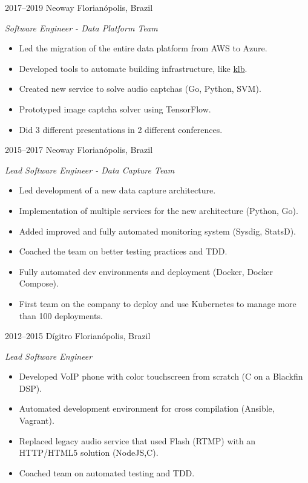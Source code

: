 \documentclass[]{friggeri-cv} %
\begin{document}
\begin{entrylist}
\entry
{2017--2019}
{Neoway}
{Florianópolis, Brazil}
{\emph{Software Engineer - Data Platform Team} \\

\begin{itemize}
  \item Led the migration of the entire data platform from AWS to Azure.
  \item Developed tools to automate building infrastructure, like {\href{https://github.com/NeowayLabs/klb}{klb}}.
  \item Created new service to solve audio captchas (Go, Python, SVM).
  \item Prototyped image captcha solver using TensorFlow.
  \item Did 3 different presentations in 2 different conferences.
\end{itemize}
}
\end{entrylist}

\begin{entrylist}
\entry
{2015--2017}
{Neoway}
{Florianópolis, Brazil}
{\emph{Lead Software Engineer - Data Capture Team} \\

\begin{itemize}
  \item Led development of a new data capture architecture.
  \item Implementation of multiple services for the new architecture (Python, Go).
  \item Added improved and fully automated monitoring system (Sysdig, StatsD).
  \item Coached the team on better testing practices and TDD.
  \item Fully automated dev environments and deployment (Docker, Docker Compose).
  \item First team on the company to deploy and use Kubernetes to manage more than 100 deployments.
\end{itemize}
}
\end{entrylist}

\begin{entrylist}
\entry
{2012--2015}
{Dígitro}
{Florianópolis, Brazil}
{\emph{Lead Software Engineer} \\

\begin{itemize}
  \item Developed VoIP phone with color touchscreen from scratch (C on a Blackfin DSP).
  \item Automated development environment for cross compilation (Ansible, Vagrant).
  \item Replaced legacy audio service that used Flash (RTMP) with an HTTP/HTML5 solution (NodeJS,C).
  \item Coached team on automated testing and TDD.
\end{itemize}
}
\end{entrylist}
\end{document}
